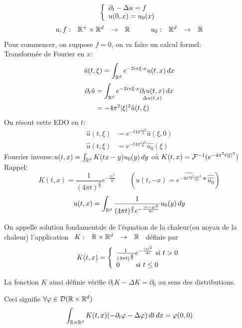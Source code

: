 \documentclass[]{report}
\begin{document}
    \[\left\{\begin{array}{ll} \partial_t-\Delta u=f\\ u(0,x)=u_0(x) \end{array} \right.\]
    \[\begin{array}{ccccc} u,f : & \mathbb{R}^+\times \mathbb{R}^d & \to & \mathbb{R} \end{array}\qquad \begin{array}{ccccc} u_0 : & \mathbb{R}^d & \to & \mathbb{R} \end{array}\]
    Pour commencer, on suppose $f=0$, on va faire un calcul formel:\\
    Transformée de Fourier en $x$:
    \[\hat{u}(t,\xi)=\int_{\mathbb{R}^d}e^{-2i\pi \xi\cdot x}u(t,x)\, dx\]
    \begin{align*}
        \partial_t\hat{u}&=\int_{\mathbb{R}^d}e^{-2i\pi \xi\cdot x}\underset{\Delta u(t,x)}{\partial_t u(t,x)}\, dx\\
        &=-4\pi^2|\xi|^2\hat{u}(t,\xi)
    \end{align*}
    On résout cette EDO en $t$:
    \begin{align*}
        \hat{u}(t,\xi)&=e^{-t4\pi^2\xi^2}\hat{u}(\xi,0)\\
        \hat{u}(t,\xi)&=e^{-t4\pi^2\xi^2}\hat{u_0}(\xi)
    \end{align*}
    Fourrier inverse:$u(t,x)=\int_{\mathbb{R}^d}K(tx-y)u_0(y)\, dy$ où $K(t,x)=\mathcal{F}^{-1}(e^{-4\pi^2 t|\xi|^2})$\\
    Rappel:
    \[K(t,x)=\frac{1}{(4\pi t)^{\frac{d}{2}}}e^{-\frac{|x|^2}{4t}}\qquad \left( u(t,-x)=\widehat{e^{-4\pi^2 t^2|\xi|^2}}*\widehat{\widehat{u_0}}\right)\]
    \[u(t,x)=\int_{\mathbb{R}^d}\frac{1}{(4\pi t)^{\frac{d}{2}}e^{-\frac{|x-y|^2}{4t}}}u_0(y)\, dy\]

    \begin{df}{}{}
        On appelle solution fondamentale de l'équation de la chaleur(ou noyau de la chaleur) l'application $\begin{array}{ccccc} K : & \mathbb{R}\times \mathbb{R}^d & \to & \mathbb{R} \end{array}$ définie par
        \[K(t,x)=\left\{\begin{array}{ll} \frac{1}{(4\pi t)^{\frac{d}{2}}}e^{-\frac{|x|^2}{4t}}\text{ si $t>0$}\\
        0\qquad \text{ si $t\le 0$} \end{array} \right.\]
    \end{df}

    \begin{prop}
        La fonction $K$ ainsi définie vérifie $\partial_t K-\Delta K=\partial_0$ au sens des distributions.
    \end{prop}

    Ceci signifie $\forall \varphi\in \mathcal{D}(\mathbb{R}\times \mathbb{R}^d)$
    \[\int_{\mathbb{R}\times \mathbb{R}^d}K(t,x)(-\partial_t\varphi-\Delta\varphi)\, dt\, dx=\varphi(0,0)\]
\end{document}
